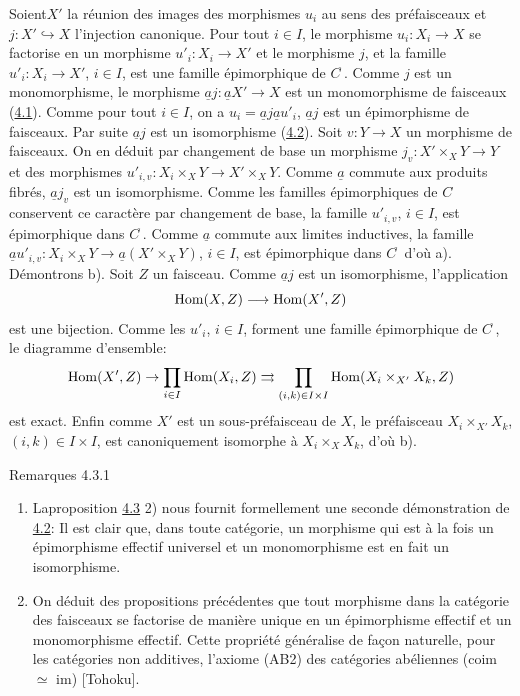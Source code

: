 \documentclass[10pt]{../fichiers-configuration-latex/smfart}
\begin{document}
Soient\pageoriginale $X'$ la réunion des images des morphismes
$u_i$ au sens des préfaisceaux et $j:X'\hookrightarrow X$
l'injection canonique. Pour tout $i\in I$, le morphisme
$u_i:X_i\rightarrow X$ se factorise en un morphisme
$u'_i:X_i\rightarrow X'$ et le morphisme $j$, et la famille
$u'_i:X_i\rightarrow X'$, $i\in I$, est une famille épimorphique
de $C^{\widehat{\phantom{,}}}$. Comme $j$ est un monomorphisme, le
morphisme $\underline{a}j:\underline{a}X'\rightarrow X$ est un monomorphisme
de faisceaux (\hyperref[II.theo4.1]{4.1}). Comme pour tout $i\in I$, on a
$u_i=\underline{a}j\underline{a}u'_i$, $\underline{a}j$ est un épimorphisme de
faisceaux. Par suite $\underline{a}j$ est un isomorphisme
(\hyperref[II.prop4.2]{4.2}). Soit $v:Y\rightarrow X$ un morphisme de
faisceaux. On en déduit par changement de base un morphisme
$j_v:X'\times_X Y\rightarrow Y$ et des morphismes
$u'_{i,v}:X_i\times_X Y\rightarrow X'\times_X Y$. Comme $\underline{a}$
commute aux produits fibrés, $\underline{a}j_v$ est un isomorphisme.
Comme les familles épimorphiques de $C^{\widehat{\phantom{,}}}$
conservent ce caractère par changement de base, la famille
$u'_{i,v}$, $i\in I$, est épimorphique dans
$C^{\widehat{\phantom{,}}}$. Comme $\underline{a}$ commute aux limites
inductives, la famille $\underline{a}u'_{i,v}:X_i\times_X Y\rightarrow
\underline{a}(X'\times_X Y)$, $i\in I$, est épimorphique dans
$C^{\widetilde{\phantom{,}}}$ d'où a). Démontrons b). Soit $Z$
un faisceau. Comme $\underline{a}j$ est un isomorphisme, l'application
$$
\operatorname{Hom}(X,Z)\longrightarrow \operatorname{Hom}(X',Z)
$$
est une bijection. Comme les $u'_i$, $i\in I$, forment une famille
épimorphique de $C^{\widehat{\phantom{,}}}$, le diagramme
d'ensemble:
$$
\operatorname{Hom}(X',Z)\rightarrow \prod_{i\in I} \operatorname{Hom}(X_i,Z)\rightrightarrows
\prod_{(i,k)\in I\times I}\operatorname{Hom}(X_i\times_{X'}X_k, Z)
$$
est exact. Enfin comme $X'$ est un sous-préfaisceau de $X$, le
préfaisceau $X_i\times_{X'}X_k$, $(i,k)\in I\times I$, est
canoniquement isomorphe à $X_i\times_X X_k$, d'où b).

\begin{enonce*}[remark]{Remarques 4.3.1}
\begin{enumerate}
\renewcommand{\labelenumi}{\theenumi)}
\item La\pageoriginale proposition \hyperref[II.prop4.3]{4.3} 2) nous fournit
  formellement
  une seconde démonstration de \hyperref[II.prop4.2]{4.2}: Il est clair que,
  dans toute
  catégorie, un morphisme qui est à la fois un épimorphisme
  effectif universel et un monomorphisme est en fait un isomorphisme.

\item On déduit des propositions précédentes que tout morphisme
  dans la catégorie des faisceaux se factorise de manière unique
  en un épimorphisme effectif et un monomorphisme effectif. Cette
  propriété généralise de façon naturelle, pour les
  catégories non additives, l'axiome (AB2) des catégories
  abéliennes (coim $\simeq$ im) [Tohoku].
\end{enumerate}
\end{enonce*}
\end{document}
